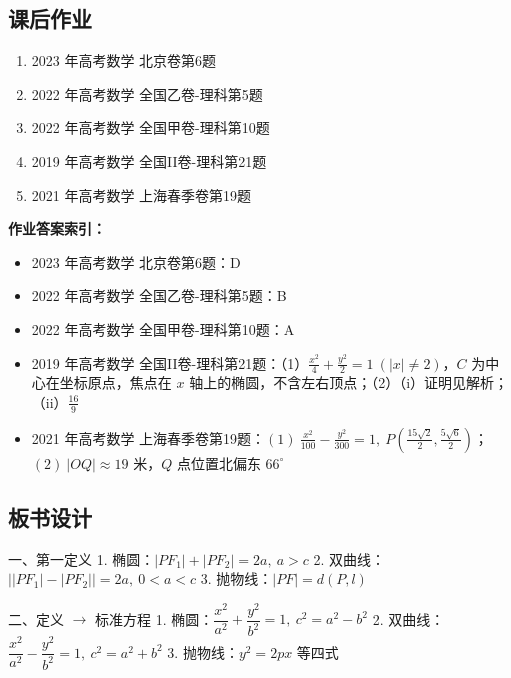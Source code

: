 \documentclass[UTF8,a4paper,11pt]{ctexart}
\begin{document}
\subsection*{课后作业}

\begin{enumerate}

\item 2023 年高考数学 北京卷第6题

\item 2022 年高考数学 全国乙卷-理科第5题

\item 2022 年高考数学 全国甲卷-理科第10题

\item 2019 年高考数学 全国II卷-理科第21题

\item 2021 年高考数学 上海春季卷第19题

\end{enumerate}

\noindent\textbf{作业答案索引：}

\begin{itemize}

\item 2023 年高考数学 北京卷第6题：D

\item 2022 年高考数学 全国乙卷-理科第5题：B

\item 2022 年高考数学 全国甲卷-理科第10题：A

\item 2019 年高考数学 全国II卷-理科第21题：（1）$\frac{x^2}{4}+\frac{y^2}{2}=1\ (|x|\neq 2)$，$C$ 为中心在坐标原点，焦点在 $x$ 轴上的椭圆，不含左右顶点；（2）（i）证明见解析；（ii）$\frac{16}{9}$

\item 2021 年高考数学 上海春季卷第19题：$(1)\ \frac{x^2}{100}-\frac{y^2}{300}=1,\ P(\frac{15\sqrt{2}}{2},\frac{5\sqrt{6}}{2})$；$(2)\ |OQ|\approx 19$ 米，$Q$ 点位置北偏东 $66^\circ$

\end{itemize}

\subsection*{板书设计}

一、第一定义
1. 椭圆：$|PF_1|+|PF_2|=2a,\ a>c$
2. 双曲线：$\bigl||PF_1|-|PF_2|\bigr|=2a,\ 0<a<c$
3. 抛物线：$|PF|=d(P,l)$

二、定义 $\to$ 标准方程
1. 椭圆：$\dfrac{x^2}{a^2}+\dfrac{y^2}{b^2}=1,\ c^2=a^2-b^2$
2. 双曲线：$\dfrac{x^2}{a^2}-\dfrac{y^2}{b^2}=1,\ c^2=a^2+b^2$
3. 抛物线：$y^2=2px$ 等四式
\end{document}
